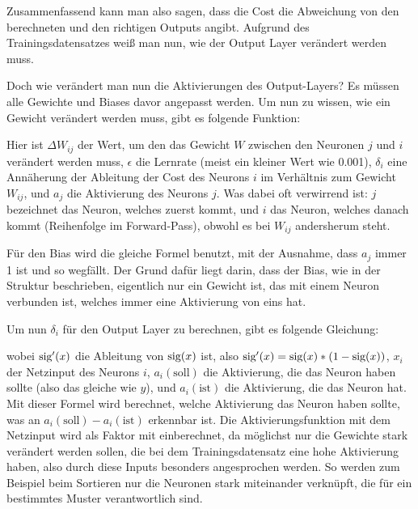 \documentclass[11pt]{scrartcl}
\begin{document}
	Zusammenfassend kann man also sagen, dass die Cost die Abweichung von den berechneten und den richtigen Outputs angibt. Aufgrund des Trainingsdatensatzes weiß man nun, wie der Output Layer verändert werden
	muss.


	Doch wie verändert man nun die Aktivierungen des Output-Layers? Es müssen alle Gewichte und Biases davor angepasst werden. Um nun zu wissen, wie ein Gewicht verändert werden muss, gibt es folgende Funktion:

	\form{\[
		\Delta W_{ij} = \epsilon * \delta_i * a_j
	\]}
%
	Hier ist  $\Delta W_{ij}$ der Wert, um den das Gewicht $W$ zwischen den Neuronen $j$ und $i$ verändert werden muss, $\epsilon$ die Lernrate (meist ein kleiner Wert wie 0.001), $\delta_i$ eine Annäherung der Ableitung der Cost des Neurons $i$ im Verhältnis zum Gewicht $W_{ij}$, und $a_j$ die Aktivierung des Neurons $j$. Was dabei oft verwirrend ist: $j$ bezeichnet das Neuron, welches zuerst kommt, und $i$ das Neuron, welches danach kommt (Reihenfolge im Forward-Pass), obwohl es bei $W_{ij}$ andersherum steht.

	Für den Bias wird die gleiche Formel benutzt, mit der Ausnahme, dass $a_j$ immer 1 ist und so wegfällt. Der Grund dafür liegt darin, dass der Bias, wie in der Struktur beschrieben, eigentlich nur ein Gewicht ist, das mit einem Neuron verbunden ist, welches immer eine Aktivierung von eins hat.

	Um nun $\delta_i$ für den Output Layer zu berechnen, gibt es folgende Gleichung: 

	\form{\[
		\delta_i = \sig '\left(x_i\right) * (a_i (\textrm{soll}) - a_i (\textrm{ist})) 
	\]}
%
	wobei $\textrm{sig} '(x)$ die Ableitung von $\textrm{sig}(x)$ ist, also $\textrm{sig}'(x) = \textrm{sig}(x) * (1 - \textrm{sig}(x))$, $x_i$ der Netzinput des Neurons $i$, $a_i(\textrm{soll})$ die Aktivierung, die das Neuron haben sollte (also das gleiche wie $y$), und $a_i(\textrm{ist})$ die Aktivierung, die das Neuron hat.
%
	Mit dieser Formel wird berechnet, welche Aktivierung das Neuron haben sollte, was an $a_i(\textrm{soll}) - a_i(\textrm{ist})$ erkennbar ist. Die Aktivierungsfunktion mit dem Netzinput wird als Faktor mit einberechnet, da möglichst nur die Gewichte stark verändert werden sollen, die bei dem Trainingsdatensatz eine hohe Aktivierung haben, also durch diese Inputs besonders angesprochen werden. So werden zum Beispiel beim Sortieren nur die Neuronen stark miteinander verknüpft, die für ein bestimmtes Muster verantwortlich sind.
	
\end{document}
